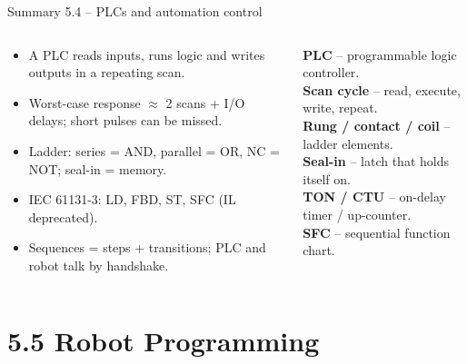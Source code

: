 \documentclass[aspectratio=169,10pt]{beamer}
\begin{document}
\begin{frame}{Summary 5.4 -- PLCs and automation control}
\begin{columns}[T,onlytextwidth]
\begin{keybox}
\small
\begin{itemize}
\item A PLC reads inputs, runs logic and writes outputs in a repeating scan.
\item Worst-case response $\approx$ 2 scans + I/O delays; short pulses can be missed.
\item Ladder: series = AND, parallel = OR, NC = NOT; seal-in = memory.
\item IEC 61131-3: LD, FBD, ST, SFC (IL deprecated).
\item Sequences = steps + transitions; PLC and robot talk by handshake.
\end{itemize}
\end{keybox}
\begin{defbox}
\small
\textbf{PLC} -- programmable logic controller.\\
\textbf{Scan cycle} -- read, execute, write, repeat.\\
\textbf{Rung / contact / coil} -- ladder elements.\\
\textbf{Seal-in} -- latch that holds itself on.\\
\textbf{TON / CTU} -- on-delay timer / up-counter.\\
\textbf{SFC} -- sequential function chart.
\end{defbox}
\end{columns}
\end{frame}

\section{5.5 Robot Programming}
\end{document}
